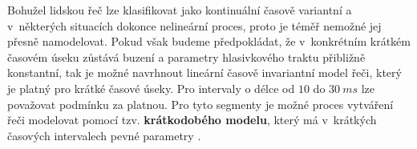 Bohužel lidskou řeč lze klasifikovat jako kontinuální časově variantní a v~některých situacích dokonce nelineární proces, proto je téměř nemožné jej přesně namodelovat. Pokud však budeme předpokládat, že v~konkrétním krátkém časovém úseku zůstává buzení a parametry hlasivkového traktu přibližně konstantní, tak je možné navrhnout lineární časově invariantní model řeči, který je platný pro krátké časové úseky.
Pro intervaly o délce od $10$ do $30\ ms$ lze považovat podmínku za platnou.
Pro tyto segmenty je možné proces vytváření řeči modelovat pomocí tzv. \textbf{krátkodobého modelu}, který má v~krátkých časových intervalech pevné parametry \cite{Holmes2001}.






